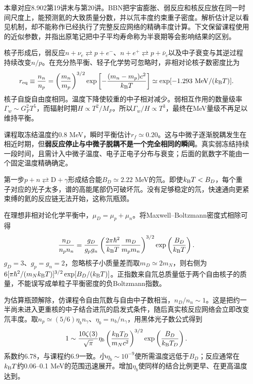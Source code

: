本章对应8.902第19讲末与第20讲。BBN把宇宙膨胀、弱反应和核反应放在同一时间尺度上，能预测氦的大致质量分数，并以氘丰度约束重子密度。解析估计足以看见机制，却不能称作已经执行了完整反应网络的精确丰度计算。下文保留课程使用的近似参数，并指出原笔记把中子平均寿命称为半衰期等会影响结果的区别。

核子形成后，弱反应$n+\nu_e\rightleftarrows p+e^-$、$n+e^+\rightleftarrows p+\bar\nu_e$以及中子衰变与其逆过程持续改变$n/p$。在充分热平衡、轻子化学势可忽略时，非相对论核子数密度比为
\[
 r_{ \rm eq}\equiv\frac{n_n}{n_p}
 =\left(\frac{m_n}{m_p}\right)^{3/2}
 \exp\left[-\frac{(m_n-m_p)c^2}{k_{\mathrm B} T}\right]
 \simeq\exp[-1.293\ \mathrm{MeV}/(k_{\mathrm B} T)].
\]
核子自旋自由度相同。温度下降使较重的中子相对减少。弱相互作用的数量级率$\Gamma_w\sim G_F^2T^5$，而辐射时期$H\propto T^2/M_P$，所以$\Gamma_w/H\propto T^3$，最终在MeV量级不再足以维持平衡。

课程取冻结温度约0.8 MeV，瞬时平衡估计$r_f\simeq0.20$。这与中微子逐渐脱耦发生在相近时期，但\textbf{弱反应停止与中微子脱耦不是一个完全相同的瞬间}。真实弱冻结持续一段时间，且需计入中微子温度、电子正电子分布与衰变；后面的氦数字不能由一个固定温度精确确定。

第一步$p+n\rightleftarrows\mathrm D+\gamma$形成结合能$B_D\simeq2.22$ MeV的氘。即使$k_{\mathrm B} T<B_D$，每个重子对应的光子太多，谱的高能尾部仍可破坏氘。没有足够稳定的氘，快速通向更紧束缚的氦的反应链无法开始，这称氘瓶颈。

在理想非相对论化学平衡中，$\mu_D=\mu_p+\mu_n$。将Maxwell--Boltzmann密度式相除可得
\[
 \frac{n_D}{n_pn_n}=\frac{g_D}{g_pg_n}
 \left(\frac{2\pi\hbar^2}{k_{\mathrm B} T}\frac{m_D}{m_pm_n}\right)^{3/2}
 \exp\left(\frac{B_D}{k_{\mathrm B} T}\right).
\]
$g_D=3$、$g_p=g_n=2$，忽略核子小质量差而取$m_D\simeq2m_N$，则右侧为$6[\pi\hbar^2/(m_Nk_{\mathrm B} T)]^{3/2}\exp[B_D/(k_{\mathrm B} T)]$。正指数来自氘总质量低于两个自由核子的质量，不能误写成单粒子平衡密度的负Boltzmann指数。

为估算瓶颈解除，仿课程令自由氘数与自由中子数相当，$n_D/n_n\sim1$。这是把约一半尚未进入更重核的中子结合进氘的启发式条件，随后真实核反应网络会立即改变氘丰度。取$n_p\simeq(5/6)\eta_b n_\gamma$、$\eta_b=n_b/n_\gamma$，用黑体光子数公式得到
\begin{equation}\label{eq:astro-deuterium-bottleneck}
 1\sim\frac{10\zeta(3)}{\sqrt\pi}\eta_b
 \left(\frac{k_{\mathrm B} T_D}{m_Nc^2}\right)^{3/2}
 \exp\left(\frac{B_D}{k_{\mathrm B} T_D}\right).
\end{equation}
系数约6.78，与课程约6.9一致。小$\eta_b\sim10^{-9}$使所需温度远低于$B_D$；反应通常在$k_{\mathrm B} T$约0.06--0.1 MeV的范围迅速展开。增加$\eta_b$使同样的结合比例更早、在更高温度达到。

